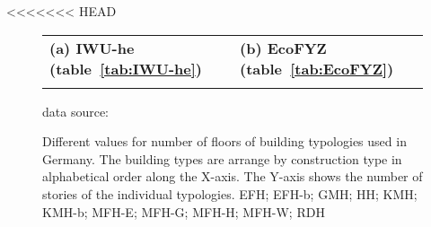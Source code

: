 <<<<<<< HEAD
\begin{figure}[htb]
\centering

\hspace{-2.5cm}
  \begin{tabular}{p{0.5\linewidth} p{0.5\linewidth} }

\textbf{(a) IWU-he (table~\ref{tab:IWU-he})}&
\textbf{(b) EcoFYZ (table~\ref{tab:EcoFYZ})}
\\
\vspace{-2cm}

&
\vspace{-2cm}
\\
  \end{tabular}
\vspace{-1.4cm}

\begin{flushright}
\footnotesize{data source:~\cite{Born.2003,Hermelink.2011}}
\end{flushright}
	\caption[Different values for number of floors of building typologies used in
	Germany.]{Different values for number of floors of building typologies used in
	Germany.
	The building types are arrange by construction type in alphabetical order along
	the X-axis.
	The Y-axis shows the number of stories of the individual typologies.
	EFH; EFH-b; GMH; HH; KMH; KMH-b; MFH-E; MFH-G; MFH-H; MFH-W; RDH}
	\label{fig:DifTypFloor}
\end{figure}

